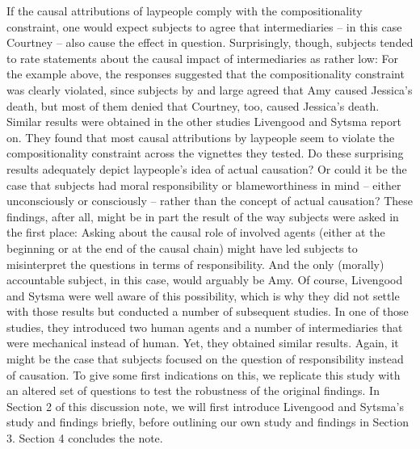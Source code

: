 \documentclass[12pt]{scrartcl}
\begin{document}
If the causal attributions of laypeople comply with the compositionality constraint, one would expect subjects to agree that intermediaries – in this case Courtney -- also cause the effect in question. Surprisingly, though, subjects tended to rate statements about the causal impact of intermediaries as rather low: For the example above, the responses suggested that the compositionality constraint was clearly violated, since subjects by and large agreed that Amy caused Jessica's death, but most of them denied that Courtney, too, caused Jessica's death. Similar results were obtained in the other studies Livengood and Sytsma report on. They found that most causal attributions by laypeople seem to violate the compositionality constraint across the vignettes they tested. Do these surprising results adequately depict laypeople's idea of actual causation? Or could it be the case that subjects had moral responsibility or blameworthiness in mind -- either unconsciously or consciously -- rather than the concept of actual causation? These findings, after all, might be in part the result of the way subjects were asked in the first place: Asking about the causal role of involved agents (either at the beginning or at the end of the causal chain) might have led subjects to misinterpret the questions in terms of responsibility. And the only (morally) accountable subject, in this case, would arguably be Amy. Of course, Livengood and Sytsma were well aware of this possibility, which is why they did not settle with those results but conducted a number of subsequent studies. In one of those studies, they introduced two human agents and a number of intermediaries that were mechanical instead of human. Yet, they obtained similar results. Again, it might be the case that subjects focused on the question of responsibility instead of causation. To give some first indications on this, we replicate this study with an altered set of questions to test the robustness of the original findings. In Section 2 of this discussion note, we will first introduce Livengood and Sytsma's study and findings briefly, before outlining our own study and findings in Section 3. Section 4 concludes the note.
\end{document}
